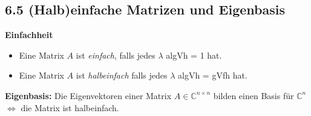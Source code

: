 \subsection{6.5 (Halb)einfache Matrizen und Eigenbasis}{
\vskip1pt
\textbf{Einfachheit}
\begin{itemize}[leftmargin=0.29cm, itemsep=0.5pt]
\item Eine Matrix $A$ ist \textit{einfach}, falls jedes $\lambda$ algVh = 1 hat.
\item Eine Matrix $A$ ist \textit{halbeinfach} falls jedes $\lambda$ algVh = gVfh hat.
\end{itemize}

\textbf{Eigenbasis:}
Die Eigenvektoren einer Matrix $A \in \mathbb{C}^{n \times n}$ bilden einen Basis für $\mathbb{C}^n$
$\Longleftrightarrow$ die Matrix ist halbeinfach.

}
\WhiteSpace
